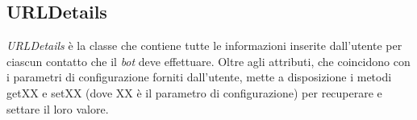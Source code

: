 \vspace*{0.5cm}
\subsection{URLDetails}
\textit{URLDetails} \`e la classe che contiene tutte le informazioni inserite dall'utente per ciascun contatto che il \textit{bot} deve effettuare. Oltre agli attributi, che coincidono con i parametri di configurazione forniti dall'utente, mette a disposizione i metodi getXX e setXX (dove XX \`e il parametro di configurazione) per recuperare e settare il loro valore.